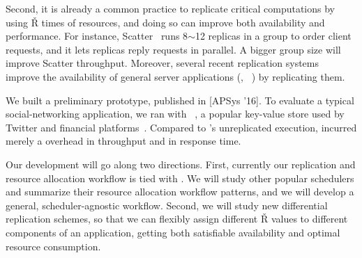 Second, it is already a common practice to replicate critical computations by 
using \v{R} times of resources, and doing so can improve both availability and 
performance. For instance, Scatter~\cite{scatter:sosp11} runs 8$\sim$12 
replicas in a \paxos group to order client requests, and it lets replicas reply 
requests in parallel. A bigger group size will improve Scatter throughput. 
Moreover, several recent replication 
systems~\cite{eve:osdi12,rex:eurosys14,crane:sosp15} 
improve the availability of general server applications (\eg, 
\mysql~\cite{mysql}) by replicating them.




 We built a preliminary \tripod prototype, 
published in [APSys '16]. To evaluate a typical social-networking application, 
we ran \tripod with \memcached~\cite{memcached}, a popular key-value store used 
by Twitter and financial platforms~\cite{nosql:finance}. Compared to 
\memcached's unreplicated execution, \tripod incurred merely a \tputoverhead 
overhead in throughput and \latencyoverhead in response time.


 Our \tripod development will go along two directions. 
First, currently our replication and resource allocation workflow is tied with 
\mesos. We will study other popular schedulers and summarize their 
resource allocation workflow patterns, and we will develop a general, 
scheduler-agnostic workflow. Second, we will study new differential replication 
schemes, so that we can flexibly assign different \v{R} values to different 
components of an application, getting both satisfiable availability and optimal 
resource consumption.

